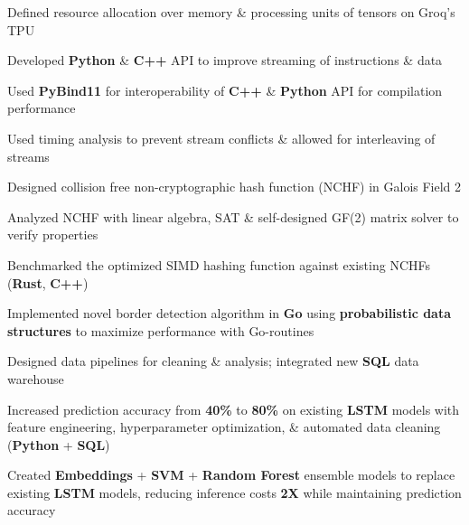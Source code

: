 \documentclass[]{chandan-cv}
\begin{document}
\begin{minipage}[t]{0.75\textwidth}
\begin{tightemize}
        \item Defined resource allocation over memory \& processing units of tensors on Groq's TPU
        \item Developed \textbf{Python} \& \textbf{C++} API to improve streaming of instructions \& data
        \item Used \textbf{PyBind11} for interoperability of \textbf{C++} \& \textbf{Python} API for compilation performance 
        \item Used timing analysis to prevent stream conflicts \& allowed for interleaving of streams
\end{tightemize}
\sectionsep

\begin{tightemize}
        \item Designed collision free non-cryptographic hash function (NCHF) in Galois Field 2
        \item Analyzed NCHF with linear algebra, SAT \& self-designed GF(2) matrix solver to verify properties
        \item Benchmarked the optimized SIMD hashing function against existing NCHFs (\textbf{Rust}, \textbf{C++})
        \item Implemented novel border detection algorithm in \textbf{Go} using \textbf{probabilistic data structures} to maximize performance with Go-routines
\end{tightemize}
\sectionsep

\begin{tightemize}
        \item Designed data pipelines for cleaning \& analysis; integrated new \textbf{SQL} data warehouse
        \item Increased prediction accuracy from \textbf{40\%} to \textbf{80\%} on existing \textbf{LSTM} 
  models with feature engineering, hyperparameter optimization, \& automated data cleaning (\textbf{Python} + \textbf{SQL})
        \item Created \textbf{Embeddings} + \textbf{SVM} + \textbf{Random Forest} ensemble models to replace existing 
  \textbf{LSTM} models, reducing inference costs \textbf{2X} while maintaining prediction accuracy
\end{tightemize}
\sectionsep


\end{minipage}
\end{document}
